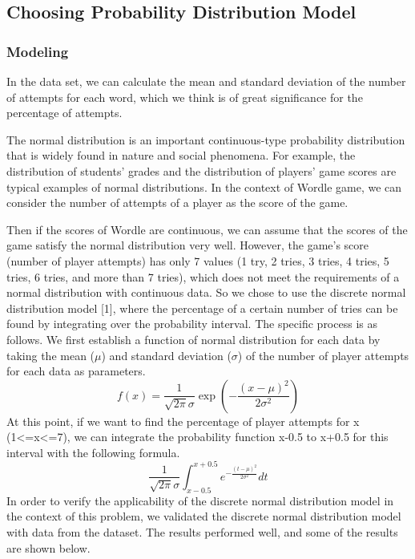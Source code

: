\documentclass[12pt]{article}  %
\begin{document}
\subsection{Choosing Probability Distribution Model}
\subsubsection{Modeling}
In the data set, we can calculate the mean and standard deviation of the number of attempts for each word, which we think is of great significance for the percentage of attempts.
	
The normal distribution is an important continuous-type probability distribution that is widely found in nature and social phenomena. For example, the distribution of students' grades and the distribution of players' game scores are typical examples of normal distributions. In the context of Wordle game, we can consider the number of attempts of a player as the score of the game.

Then if the scores of Wordle are continuous, we can assume that the scores of the game satisfy the normal distribution very well.
	However, the game's score (number of player attempts) has only 7 values (1 try, 2 tries, 3 tries, 4 tries, 5 tries, 6 tries, and more than 7 tries), which does not meet the requirements of a normal distribution with continuous data. So we chose to use the discrete normal distribution model [1], where the percentage of a certain number of tries can be found by integrating over the probability interval.
	The specific process is as follows.
We first establish a function of normal distribution for each data by taking the mean ($\mu$) and standard deviation ($\sigma$) of the number of player attempts for each data as parameters.
\begin{equation}
	f(x)=\frac{1}{\sqrt{2\pi}\sigma}\exp(-\frac{(x-\mu)^2}{2\sigma^2})
\end{equation}
At this point, if we want to find the percentage of player attempts for x (1<=x<=7), we can integrate the probability function x-0.5 to x+0.5 for this interval with the following formula.
\begin{equation}
	\frac{1}{\sqrt{2\pi}\sigma}\int^{x+0.5}_{x-0.5}e^{-\frac{(t-\mu)^2}{2\sigma^2}}dt
\end{equation}
In order to verify the applicability of the discrete normal distribution model in the context of this problem, we validated the discrete normal distribution model with data from the dataset. The results performed well, and some of the results are shown below.
\end{document}
